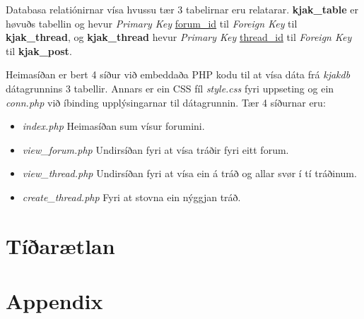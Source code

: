 \documentclass{article}
\begin{document}
\par Databasa relatiónirnar vísa hvussu
tær 3 tabelirnar eru relatarar. \textbf{kjak\_table} er høvuðs tabellin og hevur
\textit{Primary Key} \underline{forum\_id} til \textit{Foreign Key} til \textbf{kjak\_thread},
og \textbf{kjak\_thread} hevur \textit{Primary Key} \underline{thread\_id} til \textit{Foreign Key}
til \textbf{kjak\_post}.
 
\par Heimasíðan er bert 4 síður við embeddaða PHP kodu til at vísa dáta frá \textit{kjakdb}
dátagrunnins 3 tabellir. Annars er ein CSS fíl \textit{style.css} fyri uppseting
og ein \textit{conn.php} við
íbinding upplýsingarnar til dátagrunnin. Tær 4 síðurnar eru:
\begin{itemize}
    \item \textit{index.php} \- Heimasíðan sum vísur forumini.
    \item \textit{view\_forum.php} \- Undirsíðan fyri at vísa tráðir fyri eitt forum.
    \item \textit{view\_thread.php} \- Undirsíðan fyri at vísa ein á tráð og allar svør í tí
            tráðinum.
    \item \textit{create\_thread.php} \- Fyri at stovna ein nýggjan tráð.
\end{itemize}

\section{Tíðarætlan}
\par 

\section{Appendix}








\end{document}
